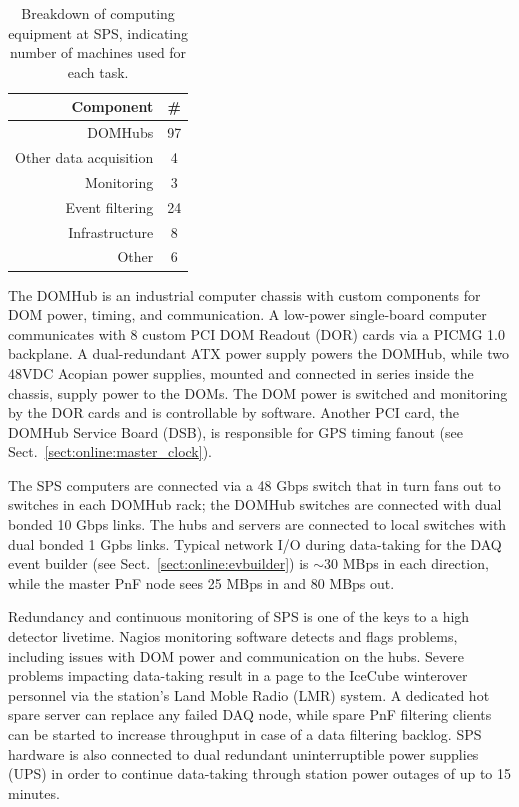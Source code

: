 \begin{table}[h]
  \centering
  \begin{tabular}{ r | c }
    \bf{Component} & \bf{\#} \\
    \hline
    DOMHubs & 97 \\
    Other data acquisition & 4 \\
    Monitoring & 3 \\
    Event filtering & 24 \\
    Infrastructure & 8 \\
    Other & 6 \\ 
  \end{tabular}
  \caption{Breakdown of computing equipment at SPS, indicating number of
    machines used for each task.} 
  \label{tab:sps_breakdown}
\end{table}

The DOMHub is an industrial computer chassis with custom components for
DOM power, timing, and communication.  A low-power single-board computer
communicates with 8 custom PCI DOM Readout (DOR) cards via a PICMG 1.0 backplane.  A
dual-redundant ATX power supply powers the DOMHub, while two 48VDC Acopian
power supplies, mounted and connected in series inside the chassis, supply
power to the DOMs.  The DOM power is switched and monitoring by the DOR
cards and is controllable by software.  Another PCI card, the DOMHub
Service Board (DSB), is responsible for GPS timing fanout (see
Sect.~\ref{sect:online:master_clock}).


The SPS computers are connected via a 48 Gbps switch that in turn fans out
to switches in each DOMHub rack; the DOMHub switches are connected with
dual bonded 10 Gbps links.  The hubs and servers are connected to local
switches with dual bonded 1 Gpbs links.  Typical network I/O during data-taking for the
DAQ event builder (see Sect.~\ref{sect:online:evbuilder}) is $\sim30$ MBps in each
direction, while the master PnF node sees 25 MBps in and 80 MBps out.

Redundancy and continuous monitoring of SPS is one of the keys to a high
detector livetime.  Nagios monitoring software detects and flags problems,
including issues with DOM power and communication on the hubs.  Severe
problems impacting data-taking result in a page to the IceCube
winterover personnel via the station's Land Moble Radio (LMR) system. 
A dedicated hot spare server can replace any failed DAQ
node, while spare PnF filtering clients can be started to increase
throughput in case of a data filtering backlog.  SPS hardware is also
connected to dual redundant uninterruptible power supplies 
(UPS) in order to continue data-taking through station power outages of up
to 15 minutes.  

